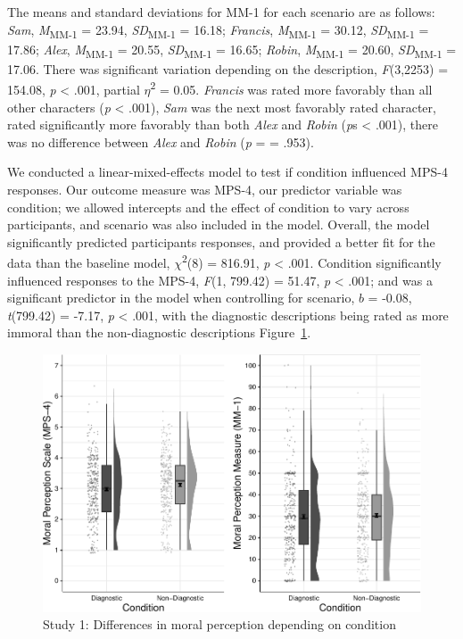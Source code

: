 \documentclass[
  man,floatsintext]{apa7}
\begin{document}
The means and standard deviations for MM-1 for each scenario are as follows:
\emph{Sam},
\emph{M}\textsubscript{MM-1} = 23.94, \emph{SD}\textsubscript{MM-1} = 16.18;
\emph{Francis},
\emph{M}\textsubscript{MM-1} = 30.12, \emph{SD}\textsubscript{MM-1} = 17.86;
\emph{Alex},
\emph{M}\textsubscript{MM-1} = 20.55, \emph{SD}\textsubscript{MM-1} = 16.65;
\emph{Robin},
\emph{M}\textsubscript{MM-1} = 20.60, \emph{SD}\textsubscript{MM-1} = 17.06. There was significant variation depending on the description, \emph{F}(3,2253) = 154.08, \emph{p} \textless{} .001, partial \(\eta\)\textsuperscript{2} = 0.05. \emph{Francis} was rated more favorably than all other characters (\emph{p} \textless{} .001), \emph{Sam} was the next most favorably rated character, rated significantly more favorably than both \emph{Alex} and \emph{Robin} (\emph{p}s \textless{} .001), there was no difference between \emph{Alex} and \emph{Robin} (\emph{p} = = .953).

We conducted a linear-mixed-effects model to test if condition influenced MPS-4 responses. Our outcome measure was MPS-4, our predictor variable was condition; we allowed intercepts and the effect of condition to vary across participants, and scenario was also included in the model.
Overall, the model significantly predicted participants responses, and provided a better fit for the data than the baseline model, \(\chi\)\textsuperscript{2}(8) = 816.91, \emph{p} \textless{} .001. Condition significantly influenced responses to the MPS-4, \emph{F}(1, 799.42) = 51.47, \emph{p} \textless{} .001; and was a significant predictor in the model when controlling for scenario, \(b\) = -0.08, \emph{t}(799.42) = -7.17, \emph{p} \textless{} .001, with the diagnostic descriptions being rated as more immoral than the non-diagnostic descriptions Figure~\ref{fig:S1bothconditionplot}.

\begin{figure}
\centering
\includegraphics{moral_dilution_in_chunks_files/figure-latex/S1bothconditionplot-1.pdf}
\caption{\label{fig:S1bothconditionplot}Study 1: Differences in moral perception depending on condition}
\end{figure}
\end{document}
